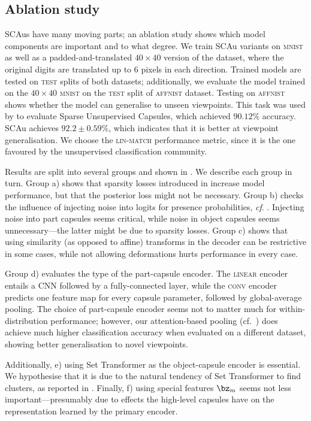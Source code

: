 \subsection{Ablation study}
\label{sec:ablation}
\gls{SCAu}s have many moving parts;
an ablation study shows which model components are important and to what degree.
We train \gls{SCAu} variants on \textsc{mnist} as well as a padded-and-translated $40\times40$ version of the dataset, where the original digits are translated up to 6 pixels in each direction.
Trained models are tested on \textsc{test} splits of both datasets; additionally, we evaluate the model trained on the $40\times40$ \textsc{mnist} on the \textsc{test} split of \textsc{affnist} dataset.
Testing on \textsc{affnist} shows whether the model can generalise to unseen viewpoints.
This task was used by \cite{Rawlinson2018sparsecaps} to evaluate Sparse Unsupervised Capsules, which achieved $90.12\%$ accuracy. \Gls{SCAu} achieves $92.2\pm 0.59\%$, which indicates that it is better at viewpoint generalisation.
We choose the \textsc{lin-match} performance metric, since it is the one favoured by the unsupervised classification community.

Results are split into several groups and shown in .
We describe each group in turn.
Group a) shows that sparsity losses introduced in  increase model performance, but that the posterior loss might not be necessary.
Group b) checks the influence of injecting noise into logits for presence probabilities, \textit{cf}. .  Injecting noise into part capsules seems critical, while noise in object capsules seems unnecessary---the latter might be due to sparsity losses.
Group c) shows that using similarity (as opposed to affine) transforms in the decoder can be restrictive in some cases, while not allowing deformations hurts performance in every case.

Group d) evaluates the type of the part-capsule encoder.
The \textsc{linear} encoder entails a \gls{CNN} followed by a fully-connected layer, while the \textsc{conv} encoder predicts one feature map for every capsule parameter, followed by global-average pooling. 
The choice of part-capsule encoder seems not to matter much for within-distribution performance; however, our attention-based pooling (cf.\ ) does achieve much higher classification accuracy when evaluated on a different dataset, showing better generalisation to novel viewpoints.

Additionally, e) using Set Transformer as the object-capsule encoder is essential.
We hypothesise that it is due to the natural tendency of Set Transformer to find clusters, as reported in \cite{Lee2019set}.
Finally, f) using special features $\bz_m$ seems not less important---presumably due to effects the high-level capsules have on the representation learned by the primary encoder.

